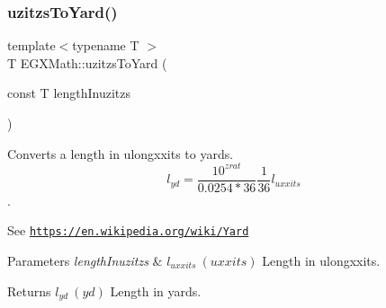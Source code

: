 \subsubsection{\texorpdfstring{uzitzs\+To\+Yard()}{uzitzsToYard()}}
{\footnotesize\ttfamily template$<$typename T $>$ \\
T E\+G\+X\+Math\+::uzitzs\+To\+Yard (\begin{DoxyParamCaption}\item[{const T}]{length\+Inuzitzs }\end{DoxyParamCaption})}



Converts a length in ulongxxits to yards. \[ l_{yd}= \frac{10^{zrat}}{0.0254 * 36} \frac{1}{36} l_{uxxits} \]. 

See \href{https://en.wikipedia.org/wiki/Yard}{\tt https\+://en.\+wikipedia.\+org/wiki/\+Yard} 
\begin{DoxyParams}{Parameters}
{\em length\+Inuzitzs} & $ l_{uxxits}\ (uxxits)$ Length in ulongxxits. \\
\hline
\end{DoxyParams}
\begin{DoxyReturn}{Returns}
$ l_{yd}\ (yd)$ Length in yards. 
\end{DoxyReturn}

